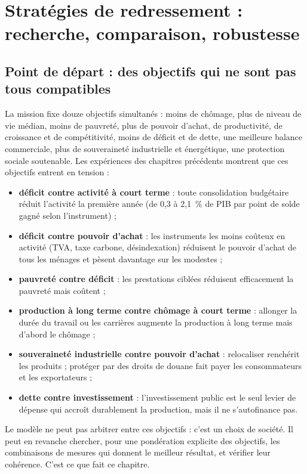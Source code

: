 \chapter{Stratégies de redressement : recherche, comparaison, robustesse}
\label{ch:strategie}

\section{Point de départ : des objectifs qui ne sont pas tous compatibles}

La mission fixe douze objectifs simultanés : moins de chômage, plus de niveau de vie médian, moins de pauvreté, plus de
pouvoir d'achat, de productivité, de croissance et de compétitivité, moins de déficit et de dette, une meilleure balance
commerciale, plus de souveraineté industrielle et énergétique, une protection sociale soutenable. Les expériences des
chapitres précédents montrent que ces objectifs entrent en tension :

\begin{itemize}
\item \textbf{déficit contre activité à court terme} : toute consolidation budgétaire réduit l'activité la première année
(de 0,3 à 2,1~\% de PIB par point de solde gagné selon l'instrument) ;
\item \textbf{déficit contre pouvoir d'achat} : les instruments les moins coûteux en activité (TVA, taxe carbone,
désindexation) réduisent le pouvoir d'achat de tous les ménages et pèsent davantage sur les modestes ;
\item \textbf{pauvreté contre déficit} : les prestations ciblées réduisent efficacement la pauvreté mais coûtent ;
\item \textbf{production à long terme contre chômage à court terme} : allonger la durée du travail ou les carrières
augmente la production à long terme mais d'abord le chômage ;
\item \textbf{souveraineté industrielle contre pouvoir d'achat} : relocaliser renchérit les produits ; protéger par des
droits de douane fait payer les consommateurs et les exportateurs ;
\item \textbf{dette contre investissement} : l'investissement public est le seul levier de dépense qui accroît durablement
la production, mais il ne s'autofinance pas.
\end{itemize}

Le modèle ne peut pas arbitrer entre ces objectifs : c'est un choix de société. Il peut en revanche chercher, pour une
pondération explicite des objectifs, les combinaisons de mesures qui donnent le meilleur résultat, et vérifier leur
cohérence. C'est ce que fait ce chapitre.

